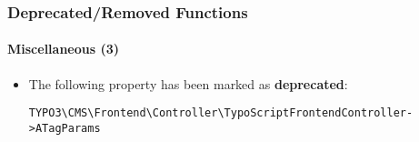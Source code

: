 %

\begin{frame}[fragile]
	\frametitle{Deprecated/Removed Functions}
	\framesubtitle{Miscellaneous (3)}


	\begin{itemize}
		\item The following property has been marked as \textbf{deprecated}:
\begin{lstlisting}
TYPO3\CMS\Frontend\Controller\TypoScriptFrontendController->ATagParams
\end{lstlisting}
	\end{itemize}

\end{frame}

